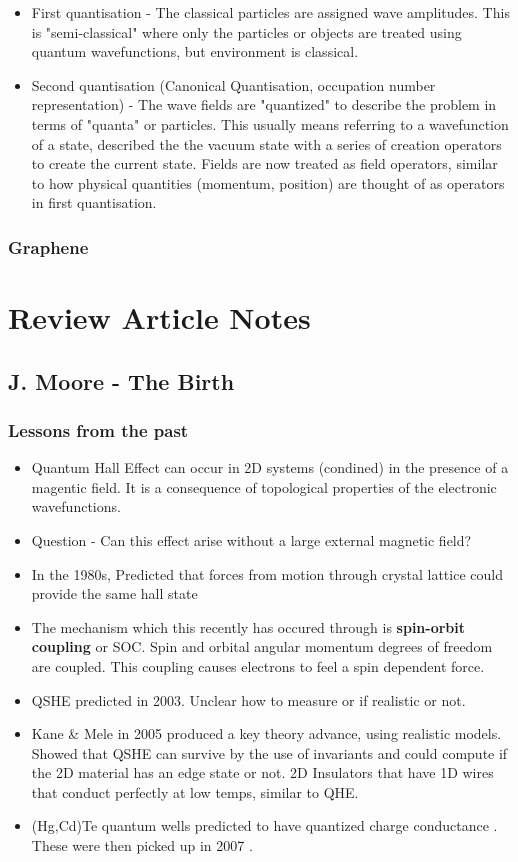 \documentclass{article} %
\begin{document}
\begin{itemize}
	\item First quantisation - The classical particles are assigned wave amplitudes. This is "semi-classical" where only the particles or objects are treated using quantum wavefunctions, but environment is classical. 
	\item Second quantisation (Canonical Quantisation, occupation number representation) - The wave fields are "quantized" to describe the problem in terms of "quanta" or particles. This usually means referring to a wavefunction of a state, described the the vacuum state with a series of creation operators to create the current state.
	Fields are now treated as field operators, similar to how physical quantities (momentum, position) are thought of as operators in first quantisation. 
\end{itemize}

\subsubsection{Graphene}


\section{Review Article Notes}
\subsection{J. Moore - The Birth\cite{moore_birth_2010}}
\subsubsection{Lessons from the past}
\begin{itemize}
	\item Quantum Hall Effect can occur in 2D systems (condined) in the presence of a magentic field. It is a consequence of topological properties of the electronic wavefunctions. 
	\item Question - Can this effect arise without a large external magnetic field?
	\item In the 1980s, Predicted that forces from motion through crystal lattice could provide the same hall state \cite{haldane_model_1988}
	\item The mechanism which this recently has occured through is \textbf{spin-orbit coupling} or SOC. Spin and orbital angular momentum degrees of freedom are coupled. This coupling causes electrons to feel a spin dependent force.
	\item QSHE predicted in 2003. Unclear how to measure or if realistic or not. \cite{murakami_dissipationless_2003, murakami_spin-hall_2004}
	\item Kane \& Mele in 2005 produced a key theory advance, using realistic models. Showed that QSHE can survive by the use of invariants and could compute if the 2D material has an edge state or not. 2D Insulators that have 1D wires that conduct perfectly at low temps, similar to QHE. \cite{kane_z_2005}
	\item (Hg,Cd)Te quantum wells predicted to have quantized charge conductance  \cite{bernevig_quantum_2006}. These were then picked up in 2007 \cite{konig_quantum_2007}.
\end{itemize}
\end{document}
